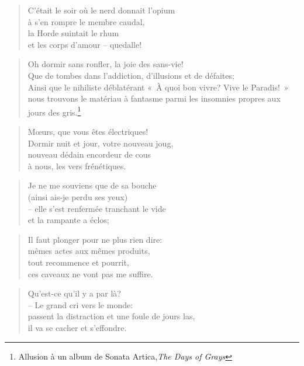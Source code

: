   \begin{verse}
    C’était le soir où le nerd donnait l’opium\\
    à s’en rompre le membre caudal,\\
    la Horde suintait le rhum\\
    et les corps d’amour -- quedalle! 
  \end{verse}
  \begin{verse}
    Oh  dormir  sans  ronfler,  la  joie  des  sans-vie!\\
    Que  de  tombes  dans l’addiction, d’illusions et de défaites;\\
    Ainsi  que  le  nihiliste  déblatérant  «~À quoi  bon  vivre?  Vive  le
    Paradis!~»\\
    nous  trouvons le  matériau à  fantasme parmi  les insomnies  propres aux
    jours des gris.\footnote{Allusion à un album de Sonata Artica,\emph{The Days of 
    Grays}}
  \end{verse}
  \begin{verse}
    Mœurs, que vous êtes électriques!\\
    Dormir nuit et jour, votre nouveau joug,\\
    nouveau dédain encordeur de cous\\
    à nous, les vers frénétiques.
  \end{verse}
  \begin{verse}
    Je ne me souviens que de sa bouche\\
    (ainsi ais-je perdu ses yeux)\\
    -- elle s’est renfermée tranchant le vide\\
    et la rampante a éclos;
  \end{verse}
  \begin{verse}
    Il faut plonger pour ne plus rien dire:\\
    mêmes actes aux mêmes produits,\\
    tout recommence et pourrit,\\
    ces caveaux ne vont pas me suffire.
  \end{verse}
  \begin{verse}
    Qu’est-ce qu’il y a par là?\\
    -- Le grand cri vers le monde:\\
    passent la distraction et une foule de jours las,\\
    il va se cacher et s’effondre.
  \end{verse}
